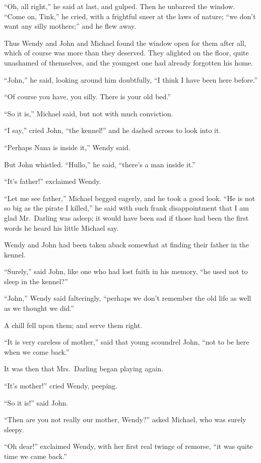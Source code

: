 ``Oh, all right,'' he said at last, and gulped. Then he unbarred the
window. ``Come on, Tink,'' he cried, with a frightful sneer at the laws
of nature; ``we don't want any silly mothers;'' and he flew away.

Thus Wendy and John and Michael found the window open for them after
all, which of course was more than they deserved. They alighted on the
floor, quite unashamed of themselves, and the youngest one had already
forgotten his home.

``John,'' he said, looking around him doubtfully, ``I think I have been
here before.''

``Of course you have, you silly. There is your old bed.''

``So it is,'' Michael said, but not with much conviction.

``I say,'' cried John, ``the kennel!'' and he dashed across to look into
it.

``Perhaps Nana is inside it,'' Wendy said.

But John whistled. ``Hullo,'' he said, ``there's a man inside it.''

``It's father!'' exclaimed Wendy.

``Let me see father,'' Michael begged eagerly, and he took a good look.
``He is not so big as the pirate I killed,'' he said with such frank
disappointment that I am glad Mr.\ Darling was asleep; it would have
been sad if those had been the first words he heard his little Michael
say.

Wendy and John had been taken aback somewhat at finding their father in
the kennel.

``Surely,'' said John, like one who had lost faith in his memory, ``he
used not to sleep in the kennel?''

``John,'' Wendy said falteringly, ``perhaps we don't remember the old life
as well as we thought we did.''

A chill fell upon them; and serve them right.

``It is very careless of mother,'' said that young scoundrel John, ``not
to be here when we come back.''

It was then that Mrs.\ Darling began playing again.

``It's mother!'' cried Wendy, peeping.

``So it is!'' said John.

``Then are you not really our mother, Wendy?'' asked Michael, who was
surely sleepy.

``Oh dear!'' exclaimed Wendy, with her first real twinge of remorse, ``it
was quite time we came back.''

